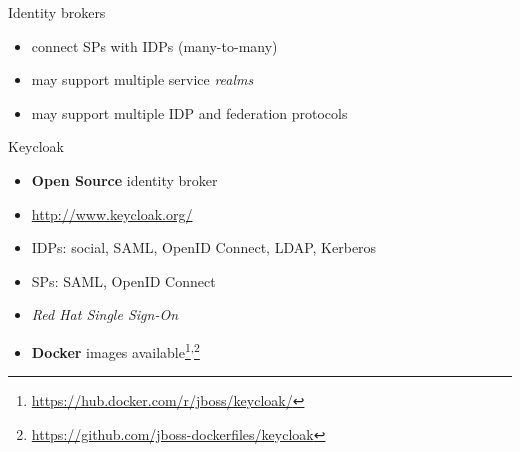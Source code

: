 \documentclass[ignorenonframetext,aspectratio=169]{beamer}
\providecommand{\tightlist}{%
  \setlength{\itemsep}{0pt}\setlength{\parskip}{0pt}}
\begin{document}
\begin{frame}{Identity brokers}

\begin{itemize}
\tightlist
\item
  connect SPs with IDPs (many-to-many)
\item
  may support multiple service \emph{realms}
\item
  may support multiple IDP and federation protocols
\end{itemize}

\end{frame}

\begin{frame}[plain]
\centering
{}
\end{frame}

\begin{frame}{Keycloak}

\begin{itemize}
\tightlist
\item {\bf Open Source} identity broker
\item \url{http://www.keycloak.org/}
\item IDPs: social, SAML, OpenID Connect, LDAP, Kerberos
\item SPs: SAML, OpenID Connect
\item {\em Red Hat Single Sign-On}
\item {\bf Docker} images available\footnote{
        \url{https://hub.docker.com/r/jboss/keycloak/}
    }\textsuperscript{,}\footnote{
        \url{https://github.com/jboss-dockerfiles/keycloak}
    }
\end{itemize}
\end{frame}
\end{document}
